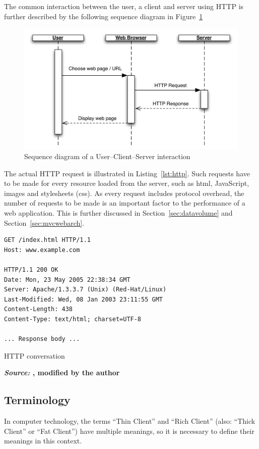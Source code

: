 The common interaction between the user, a client and server using HTTP is further described by the following sequence diagram in Figure~\ref{fig:http}

\begin{figure}[H]
	\centering
	\includegraphics[width=16cm]{images/http.pdf}
	\caption{Sequence diagram of a User--Client--Server interaction}
	\label{fig:http}
\end{figure}

The actual HTTP request is illustrated in Listing~\ref{lst:http}. Such requests have to be made for every resource loaded from the server, such as \gls{html}, JavaScript, images and stylesheets (\gls{css}). As every request includes protocol overhead, the number of requests to be made is an important factor to the performance of a web application. This is further discussed in Section~\ref{sec:datavolume} and Section~\ref{sec:mvcwebarch}.
\begin{listing}[H]
\begin{verbatim}
GET /index.html HTTP/1.1
Host: www.example.com

HTTP/1.1 200 OK
Date: Mon, 23 May 2005 22:38:34 GMT
Server: Apache/1.3.3.7 (Unix) (Red-Hat/Linux)
Last-Modified: Wed, 08 Jan 2003 23:11:55 GMT
Content-Length: 438
Content-Type: text/html; charset=UTF-8

... Response body ...
\end{verbatim}
\caption{HTTP conversation}
\label{lst:http}
\footnotesize{\textbf{\textit{Source: }, modified by the author}}
\end{listing}

\subsection{Terminology}
\label{sec:terminology}
In computer technology, the terms ``Thin Client'' and ``Rich Client'' (also: ``Thick Client'' or ``Fat Client'') have multiple meanings, so it is necessary to define their meanings in this context.

